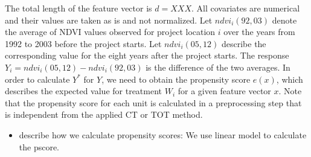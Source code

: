The total length of the feature vector is $d=XXX$. All covariates are numerical and their values are taken as is and not normalized. 
Let $ndvi_i(92,03)$ denote the average of NDVI values observed for project location $i$ over the years from 1992 to 2003 before the project starts. Let $ndvi_i(05,12)$ describe the corresponding value for the eight years after the project starts.
The response $Y_i = ndvi_i(05,12)-ndvi_i(92,03)$ is the difference of the two averages.
In order to calculate $Y^\ast$ for $Y$, we need to obtain the propensity score $e(x)$, which describes the expected value for treatment $W_i$ for a given feature vector $x$. Note that the propensity score for each unit is calculated in a preprocessing step that is independent from the applied CT or TOT method. 

\begin{itemize}
\item describe how we calculate propensity scores: We use linear model to calculate the pscore. 
\end{itemize}
 



